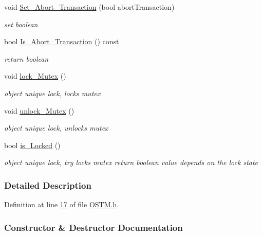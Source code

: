 \begin{DoxyCompactItemize}
void \hyperlink{class_o_s_t_m_aba384cf65c5f56f5b86833730c3c6ea4}{Set\+\_\+\+Abort\+\_\+\+Transaction} (bool abort\+Transaction)
\begin{DoxyCompactList}\small\item\em set boolean \end{DoxyCompactList}\item 
bool \hyperlink{class_o_s_t_m_afc2851abf5342c3c67342c2c14820115}{Is\+\_\+\+Abort\+\_\+\+Transaction} () const 
\begin{DoxyCompactList}\small\item\em return boolean \end{DoxyCompactList}\item 
void \hyperlink{class_o_s_t_m_af192c598a3c647f37aaba5757e60240f}{lock\+\_\+\+Mutex} ()
\begin{DoxyCompactList}\small\item\em object unique lock, locks mutex \end{DoxyCompactList}\item 
void \hyperlink{class_o_s_t_m_a6cd703bc26c719fd95b4f5362d050762}{unlock\+\_\+\+Mutex} ()
\begin{DoxyCompactList}\small\item\em object unique lock, unlocks mutex \end{DoxyCompactList}\item 
bool \hyperlink{class_o_s_t_m_afb6520023ed2c4a6188b688c46f192d0}{is\+\_\+\+Locked} ()
\begin{DoxyCompactList}\small\item\em object unique lock, try locks mutex return boolean value depends on the lock state \end{DoxyCompactList}\end{DoxyCompactItemize}


\subsubsection{Detailed Description}


Definition at line \hyperlink{_o_s_t_m_8h_source_l00017}{17} of file \hyperlink{_o_s_t_m_8h_source}{O\+S\+T\+M.\+h}.



\subsubsection{Constructor \& Destructor Documentation}
